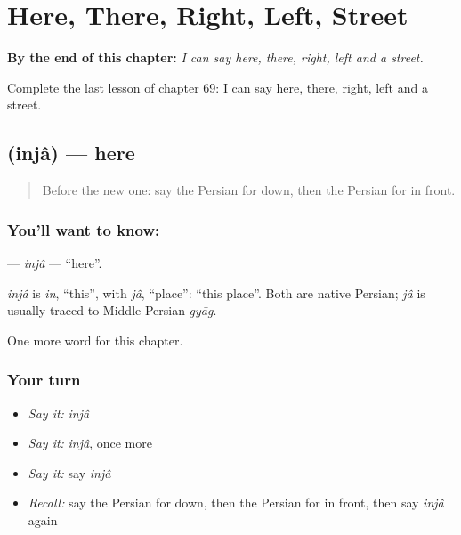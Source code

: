 
\chapter{Here, There, Right, Left, Street}
\label{ch:fa-here-there-right-left-street}

\begin{chapteropening}
\textbf{By the end of this chapter:} \emph{I can say here, there, right, left and a street.}

Complete the last lesson of chapter 69: I can say here, there, right, left and a street.
\end{chapteropening}

\section[\texorpdfstring{\fa{اینجا} (injâ)}{اینجا (injâ)}]{ (injâ) — here}

\label{lesson:FA-C69-inja}



\begin{quote}
Before the new one: say the Persian for down, then the Persian for in front.
\end{quote}

\subsection*{You'll want to know: }
\textbf{} — \emph{injâ} — \textquotedblleft{}here\textquotedblright{}.

\begin{cousinweb}
\emph{injâ} is \emph{in}, \textquotedblleft{}this\textquotedblright{}, with \emph{jâ}, \textquotedblleft{}place\textquotedblright{}: \textquotedblleft{}this place\textquotedblright{}. Both are native Persian; \emph{jâ} is usually traced to Middle Persian \emph{gyāg}.
\end{cousinweb}

\begin{grammarlens}[title={What you've built}]
One more word for this chapter.
\end{grammarlens}

\subsection*{Your turn}
\begin{itemize}
\raggedright
  \item \emph{Say it:} \emph{injâ}
  \item \emph{Say it:} \emph{injâ}, once more
  \item \emph{Say it:} say \emph{injâ}
  \item \emph{Recall:} say the Persian for down, then the Persian for in front, then say \emph{injâ} again
\end{itemize}

